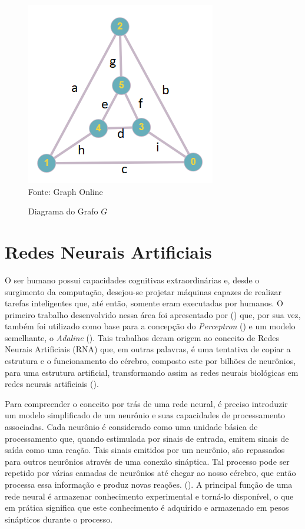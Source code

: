 \begin{figure}[ht!]
\caption{Diagrama do Grafo $G$}
\label{fig:graphExample1}
\centering
\includegraphics[scale=0.75]{img/graphExample1.png}
{\fontsize{11pt}{\baselineskip}\selectfont
\\Fonte: Graph Online\footnotemark
}
\end{figure}

\section{Redes Neurais Artificiais} %
O ser humano possui capacidades cognitivas extraordinárias e, desde o surgimento da computação, desejou-se projetar máquinas capazes de realizar tarefas inteligentes que, até então, somente eram  executadas por humanos. O primeiro trabalho desenvolvido nessa área foi apresentado por (\cite{mcculloch1943logical}) que, por sua vez, também foi utilizado como base para a concepção do \textit{Perceptron} (\cite{rosenblatt1958perceptron}) e um modelo semelhante, o \textit{Adaline} (\cite{widrow1960adaptive}). Tais trabalhos deram origem ao conceito de Redes Neurais Artificiais (RNA) que, em outras palavras, é uma tentativa de copiar a estrutura e o funcionamento do cérebro, composto este por bilhões de neurônios, para uma estrutura artificial, transformando assim as redes neurais biológicas em redes neurais artificiais (\cite{Rauber2005}).

Para compreender o conceito por trás de uma rede neural, é preciso introduzir um modelo simplificado de um neurônio e suas capacidades de processamento associadas. Cada neurônio é considerado como uma unidade básica de processamento que, quando estimulada por sinais de entrada, emitem sinais de saída como uma reação. Tais sinais emitidos por um neurônio, são repassados para outros neurônios através de uma conexão sináptica. Tal processo pode ser repetido por várias camadas de neurônios até chegar ao nosso cérebro, que então processa essa informação e produz novas reações. (\cite{baeza1999modern}). A principal função de uma rede neural é armazenar conhecimento experimental e torná-lo disponível, o que em prática significa que este conhecimento é adquirido e armazenado em pesos sinápticos durante o processo.

